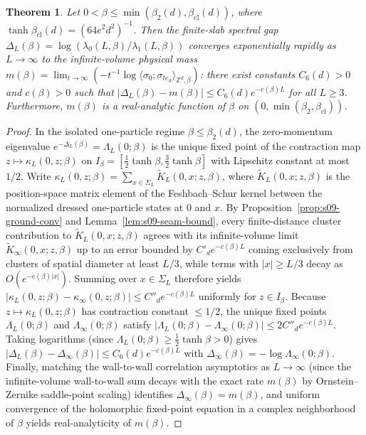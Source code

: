 \documentclass[11pt]{article}
\newtheorem{theorem}{Theorem}[section]
\theoremstyle{definition}
\begin{document}
\begin{theorem}
\label{thm:s09-gap-limit}
Let $0 < \beta \le \min(\beta_2(d), \beta_{\mathrm{cl}}(d))$, where $\tanh
\beta_{\mathrm{cl}}(d) = (64 e^2 d^2)^{-1}$. Then the finite-slab spectral gap
$\Delta_L(\beta) = \log(\lambda_0(L, \beta) / \lambda_1(L, \beta))$ converges
exponentially rapidly as $L \to \infty$ to the infinite-volume physical mass
$m(\beta) = \lim_{t \to \infty} (-t^{-1} \log \langle \sigma_0 ; \sigma_{t e_d}
\rangle_{\mathbb{Z}^d,\beta})$: there exist constants $C_6(d) > 0$ and $c(\beta) >
0$ such that $|\Delta_L(\beta) - m(\beta)| \le C_6(d) e^{-c(\beta) L}$ for all $L
\ge 3$. Furthermore, $m(\beta)$ is a real-analytic function of $\beta$ on $(0,
\min(\beta_2, \beta_{\mathrm{cl}}))$.
\end{theorem}
\begin{proof}
In the isolated one-particle regime $\beta \le \beta_2(d)$, the zero-momentum
eigenvalue $e^{-\Delta_L(\beta)} = \Lambda_L(0; \beta)$ is the unique fixed point of
the contraction map $z \mapsto \kappa_L(0, z; \beta)$ on $I_\beta = [\frac{1}{2}
\tanh \beta, \frac{3}{2} \tanh \beta]$ with Lipschitz constant at most $1/2$. Write
$\kappa_L(0, z; \beta) = \sum_{x \in \Sigma_L} \widetilde{K}_L(0, x; z, \beta)$,
where $\widetilde{K}_L(0, x; z, \beta)$ is the position-space matrix element of the
Feshbach--Schur kernel between the normalized dressed one-particle states at $0$ and
$x$. By Proposition~\ref{prop:s09-ground-conv} and Lemma~\ref{lem:s09-seam-bound},
every finite-distance cluster contribution to $\widetilde{K}_L(0, x; z, \beta)$
agrees with its infinite-volume limit $\widetilde{K}_\infty(0, x; z, \beta)$ up to
an error bounded by $C'_d e^{-c(\beta) L}$ coming exclusively from clusters of
spatial diameter at least $L/3$, while terms with $|x| \ge L/3$ decay as
$O(e^{-c(\beta)|x|})$. Summing over $x \in \Sigma_L$ therefore yields $|\kappa_L(0,
z; \beta) - \kappa_\infty(0, z; \beta)| \le C''_d e^{-c(\beta) L}$ uniformly for $z
\in I_\beta$. Because $z \mapsto \kappa_L(0, z; \beta)$ has contraction constant
$\le 1/2$, the unique fixed points $\Lambda_L(0; \beta)$ and $\Lambda_\infty(0;
\beta)$ satisfy $|\Lambda_L(0; \beta) - \Lambda_\infty(0; \beta)| \le 2 C''_d
e^{-c(\beta) L}$. Taking logarithms (since $\Lambda_L(0; \beta) \ge \frac{1}{2}
\tanh \beta > 0$) gives $|\Delta_L(\beta) - \Delta_\infty(\beta)| \le C_6(d)
e^{-c(\beta) L}$ with $\Delta_\infty(\beta) = -\log \Lambda_\infty(0; \beta)$.
Finally, matching the wall-to-wall correlation asymptotics as $L \to \infty$ (since
the infinite-volume wall-to-wall sum decays with the exact rate $m(\beta)$ by
Ornstein--Zernike saddle-point scaling) identifies $\Delta_\infty(\beta) =
m(\beta)$, and uniform convergence of the holomorphic fixed-point equation in a
complex neighborhood of $\beta$ yields real-analyticity of $m(\beta)$.
\end{proof}
\end{document}
